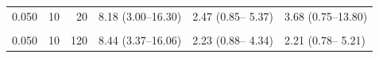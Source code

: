 \begin{tabular}{r|r|r|l|l|l}
\hline
\cellcolor{gray!6}{0.050} & \cellcolor{gray!6}{10} & \cellcolor{gray!6}{2} & \cellcolor{gray!6}{9.47 (2.382–24.46)} & \cellcolor{gray!6}{2.49 (0.362– 7.16)} & \cellcolor{gray!6}{4.60 (0.088–22.81)}\\
\hline
0.050 & 10 & 20 & 8.18 (3.00–16.30) & 2.47 (0.85– 5.37) & 3.68 (0.75–13.80)\\
\hline
\cellcolor{gray!6}{0.050} & \cellcolor{gray!6}{10} & \cellcolor{gray!6}{40} & \cellcolor{gray!6}{8.22 (3.20–15.88)} & \cellcolor{gray!6}{2.38 (0.90– 4.87)} & \cellcolor{gray!6}{2.99 (0.83– 9.64)}\\
\hline
0.050 & 10 & 120 & 8.44 (3.37–16.06) & 2.23 (0.88– 4.34) & 2.21 (0.78– 5.21)\\
\hline
\end{tabular}